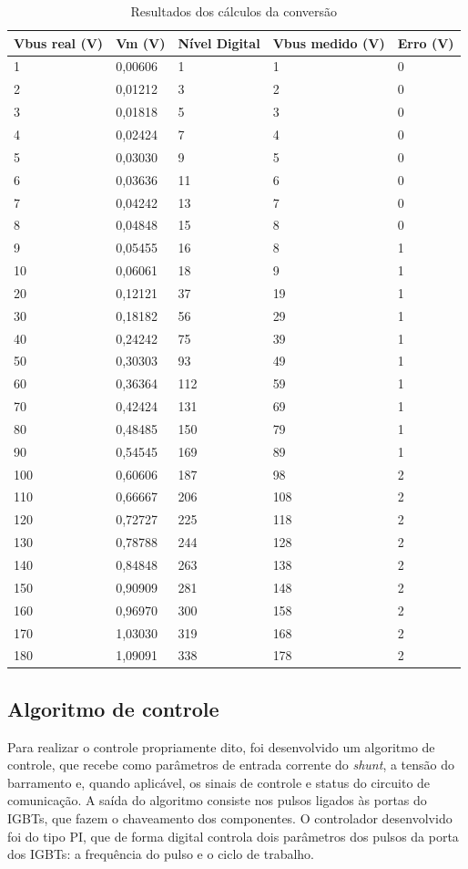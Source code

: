 \begin{table}[H]
    \centering
    \caption{Resultados dos cálculos da conversão}
    \begin{tabular}{| m{6em} | m{4em} | m{6em} | m{7em} | m{4em} | } 
    \hline
     Vbus real (V)&  Vm (V)&  Nível Digital&  Vbus medido (V)&  Erro (V)\\
     \hline
		1	&0,00606	&1		&1		&0\\\hline
		2	&0,01212	&3		&2		&0\\\hline
		3	&0,01818	&5		&3		&0\\\hline
		4	&0,02424	&7		&4		&0\\\hline
		5	&0,03030	&9		&5		&0\\\hline
		6	&0,03636	&11		&6		&0\\\hline
		7	&0,04242	&13		&7		&0\\\hline
		8	&0,04848	&15		&8		&0\\\hline
		9	&0,05455	&16		&8		&1\\\hline
		10	&0,06061	&18		&9		&1\\\hline
		20	&0,12121	&37		&19		&1\\\hline
		30	&0,18182	&56		&29		&1\\\hline
		40	&0,24242	&75		&39		&1\\\hline
		50	&0,30303	&93		&49		&1\\\hline
		60	&0,36364	&112	&59		&1\\\hline
		70	&0,42424	&131	&69		&1\\\hline
		80	&0,48485	&150	&79		&1\\\hline
		90	&0,54545	&169	&89		&1\\\hline
		100	&0,60606	&187	&98		&2\\\hline
		110	&0,66667	&206	&108	&2\\\hline
		120	&0,72727	&225	&118	&2\\\hline
		130	&0,78788	&244	&128	&2\\\hline
		140	&0,84848	&263	&138	&2\\\hline
		150	&0,90909	&281	&148	&2\\\hline
		160	&0,96970	&300	&158	&2\\\hline
		170	&1,03030	&319	&168	&2\\\hline
		180	&1,09091	&338	&178	&2\\
     \hline
    \end{tabular}
    \label{table-vbus}
\end{table}

\subsection{Algoritmo de controle}
Para realizar o controle propriamente dito, foi desenvolvido um algoritmo de controle, que recebe como parâmetros de entrada corrente do \textit{shunt}, a tensão do barramento e, quando aplicável, os sinais de controle e status do circuito de comunicação. A saída do algoritmo consiste nos pulsos ligados às portas do IGBTs, que fazem o chaveamento dos componentes. O controlador desenvolvido foi do tipo PI, que de forma digital controla dois parâmetros dos pulsos da porta dos IGBTs: a frequência do pulso e o ciclo de trabalho.

